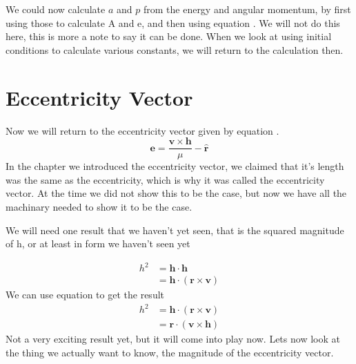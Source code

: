 We could now calculate $a$ and $p$ from the energy and angular momentum, by
first using those to calculate A and e, and then using equation .
We will not do this here, this is more a note to say it can be done. When we
look at using initial conditions to calculate various constants, we will return
to the calculation then.

\section{Eccentricity Vector}

Now we will return to the eccentricity vector given by equation .
\begin{equation*}
\mathbf{e} = \frac{\mathbf{v} \times \mathbf{h}}{\mu} - \hat{\mathbf{r}} 
\end{equation*}
In the chapter we introduced the eccentricity vector, we claimed that it's 
length was the same as the eccentricity, which is why it was called the
eccentricity vector. At the time we did not show this to be the case, but
now we have all the machinary needed to show it to be the case.

We will need one result that we haven't yet seen, that is the squared
magnitude of h, or at least in form we haven't seen yet

\begin{align}
h^2 &= \mathbf{h}\cdot\mathbf{h} \nonumber \\
&= \mathbf{h}\cdot(\mathbf{r}\times\mathbf{v})
\end{align}
We can use equation  to get the result
\begin{align}
h^2 &= \mathbf{h}\cdot(\mathbf{r}\times\mathbf{v}) \nonumber \\
&= \mathbf{r}\cdot(\mathbf{v}\times\mathbf{h}) \label{eq:phys-geom7}
\end{align}
Not a very exciting result yet, but it will come into play now.
Lets now look at the thing we actually want to know, the magnitude of the
eccentricity vector.

